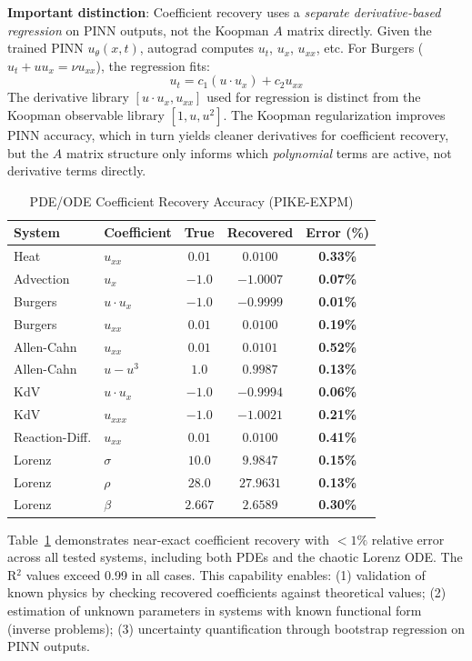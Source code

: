 \documentclass{article}
\theoremstyle{remark}
\begin{document}
\textbf{Important distinction}: Coefficient recovery uses a \emph{separate derivative-based regression} on PINN outputs, not the Koopman $A$ matrix directly. Given the trained PINN $u_\theta(x,t)$, autograd computes $u_t$, $u_x$, $u_{xx}$, etc. For Burgers ($u_t + uu_x = \nu u_{xx}$), the regression fits:
\begin{equation}
u_t = c_1 (u \cdot u_x) + c_2 u_{xx}
\end{equation}
The derivative library $[u \cdot u_x, u_{xx}]$ used for regression is distinct from the Koopman observable library $[1, u, u^2]$. The Koopman regularization improves PINN accuracy, which in turn yields cleaner derivatives for coefficient recovery, but the $A$ matrix structure only informs which \emph{polynomial} terms are active, not derivative terms directly.

\begin{table}[H]
\centering
\caption{PDE/ODE Coefficient Recovery Accuracy (PIKE-EXPM)}
\label{tab:coefficient_recovery}
\begin{tabular}{llccc}
\toprule
System & Coefficient & True & Recovered & Error (\%) \\
\midrule
Heat & $u_{xx}$ & $0.01$ & $0.0100$ & \textbf{0.33\%} \\
Advection & $u_x$ & $-1.0$ & $-1.0007$ & \textbf{0.07\%} \\
Burgers & $u \cdot u_x$ & $-1.0$ & $-0.9999$ & \textbf{0.01\%} \\
Burgers & $u_{xx}$ & $0.01$ & $0.0100$ & \textbf{0.19\%} \\
Allen-Cahn & $u_{xx}$ & $0.01$ & $0.0101$ & \textbf{0.52\%} \\
Allen-Cahn & $u - u^3$ & $1.0$ & $0.9987$ & \textbf{0.13\%} \\
KdV & $u \cdot u_x$ & $-1.0$ & $-0.9994$ & \textbf{0.06\%} \\
KdV & $u_{xxx}$ & $-1.0$ & $-1.0021$ & \textbf{0.21\%} \\
Reaction-Diff. & $u_{xx}$ & $0.01$ & $0.0100$ & \textbf{0.41\%} \\
\midrule
Lorenz & $\sigma$ & $10.0$ & $9.9847$ & \textbf{0.15\%} \\
Lorenz & $\rho$ & $28.0$ & $27.9631$ & \textbf{0.13\%} \\
Lorenz & $\beta$ & $2.667$ & $2.6589$ & \textbf{0.30\%} \\
\bottomrule
\end{tabular}
\end{table}

Table~\ref{tab:coefficient_recovery} demonstrates near-exact coefficient recovery with $<1\%$ relative error across all tested systems, including both PDEs and the chaotic Lorenz ODE. The R$^2$ values exceed 0.99 in all cases. This capability enables: (1) validation of known physics by checking recovered coefficients against theoretical values; (2) estimation of unknown parameters in systems with known functional form (inverse problems); (3) uncertainty quantification through bootstrap regression on PINN outputs.
\end{document}
